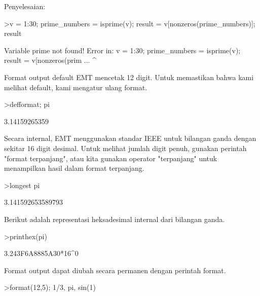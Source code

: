 \documentclass{article}
\begin{document}
\begin{eulernotebook}
\begin{eulercomment}
\begin{eulercomment}
\begin{eulercomment}
Penyelesaian:
\end{eulercomment}
\begin{eulerprompt}
>v = 1:30; prime_numbers = isprime(v); result = v[nonzeros(prime_numbers)]; result
\end{eulerprompt}
\begin{euleroutput}
  Variable prime not found!
  Error in:
  v = 1:30; prime_numbers = isprime(v); result = v[nonzeros(prim ...
                          ^
\end{euleroutput}
\eulersubheading{}
\begin{eulercomment}
Format output default EMT mencetak 12 digit. Untuk memastikan bahwa
kami melihat default, kami mengatur ulang format.
\end{eulercomment}
\begin{eulerprompt}
>defformat; pi
\end{eulerprompt}
\begin{euleroutput}
  3.14159265359
\end{euleroutput}
\begin{eulercomment}
Secara internal, EMT menggunakan standar IEEE untuk bilangan ganda
dengan sekitar 16 digit desimal. Untuk melihat jumlah digit penuh,
gunakan perintah "format terpanjang", atau kita gunakan operator
"terpanjang" untuk menampilkan hasil dalam format terpanjang.
\end{eulercomment}
\begin{eulerprompt}
>longest pi
\end{eulerprompt}
\begin{euleroutput}
        3.141592653589793 
\end{euleroutput}
\begin{eulercomment}
Berikut adalah representasi heksadesimal internal dari bilangan ganda.
\end{eulercomment}
\begin{eulerprompt}
>printhex(pi)
\end{eulerprompt}
\begin{euleroutput}
  3.243F6A8885A30*16^0
\end{euleroutput}
\begin{eulercomment}
Format output dapat diubah secara permanen dengan perintah format.
\end{eulercomment}
\begin{eulerprompt}
>format(12,5); 1/3, pi, sin(1)
\end{eulerprompt}
\begin{euleroutput}

\end{euleroutput}
\end{eulercomment}
\end{eulercomment}
\end{eulernotebook}
\end{document}
